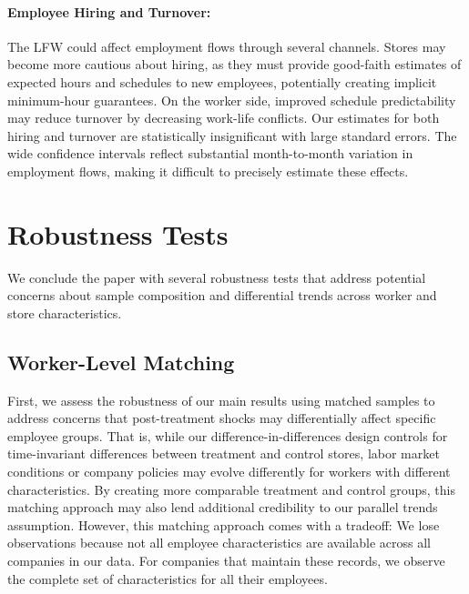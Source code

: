 \documentclass[letterpaper,11pt,leqno]{article}
\theoremstyle{paper}
\begin{document}
\paragraph{Employee Hiring and Turnover:} The LFW could affect employment flows through several channels. Stores may become more cautious about hiring, as they must provide good-faith estimates of expected hours and schedules to new employees, potentially creating implicit minimum-hour guarantees. On the worker side, improved schedule predictability may reduce turnover by decreasing work-life conflicts. Our estimates for both hiring and turnover are statistically insignificant with large standard errors. The wide confidence intervals reflect substantial month-to-month variation in employment flows, making it difficult to precisely estimate these effects. 




\section{Robustness Tests} \label{sec:robustness_tests}

We conclude the paper with several robustness tests that address potential concerns about sample composition and differential trends across worker and store characteristics.

\subsection{Worker-Level Matching}

First, we assess the robustness of our main results using matched samples to address concerns that post-treatment shocks may differentially affect specific employee groups. That is, while our difference-in-differences design controls for time-invariant differences between treatment and control stores, labor market conditions or company policies may evolve differently for workers with different characteristics. By creating more comparable treatment and control groups, this matching approach may also lend additional credibility to our parallel trends assumption. However, this matching approach comes with a tradeoff: We lose observations because not all employee characteristics are available across all companies in our data. For companies that maintain these records, we observe the complete set of characteristics for all their employees.
\end{document}
